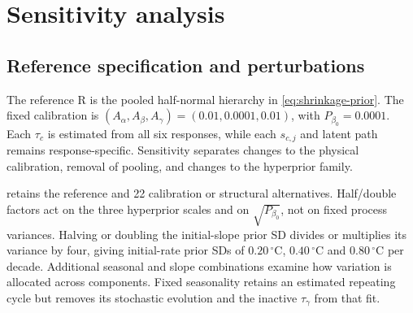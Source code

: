 \documentclass[11pt,a4paper]{article}
\newcommand{\Cdeg}{\,^\circ\mathrm{C}}
\begin{document}
	\section{Sensitivity analysis}
\label{supp:sensitivity}

\subsection{Reference specification and perturbations}

The reference R is the pooled half-normal hierarchy in
\cref{eq:shrinkage-prior}. The fixed calibration is
\((A_\alpha,A_\beta,A_\gamma)=(0.01,0.0001,0.01)\), with
\(P_{\beta_0}=0.0001\). Each \(\tau_c\) is estimated from all six
responses, while each \(s_{c,j}\) and latent path remains response-specific.
Sensitivity separates changes to the physical calibration, removal of
pooling, and changes to the hyperprior family.

 retains the reference and 22 calibration
or structural alternatives. Half/double factors act on the three
hyperprior scales and on \(\sqrt{P_{\beta_0}}\), not on fixed process
variances. Halving or doubling the initial-slope prior SD divides or
multiplies its variance by four, giving initial-rate prior SDs of
\(0.20\Cdeg\), \(0.40\Cdeg\) and \(0.80\Cdeg\) per decade.
Additional seasonal and slope combinations examine how variation is
allocated across components. Fixed seasonality retains an estimated
repeating cycle but removes its stochastic evolution and the inactive
\(\tau_\gamma\) from that fit.
\end{document}
